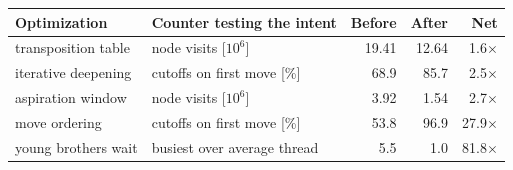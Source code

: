 \begin{table}[htbp]
\centering
\footnotesize
\setlength{\tabcolsep}{5pt}
\begin{tabular}{@{}llrrr@{}}
\toprule
Optimization & Counter testing the intent & Before & After & Net \\
\midrule
transposition table & node visits [$10^6$] & 19.41 & 12.64 & 1.6$\times$ \\
iterative deepening & cutoffs on first move [\%] & 68.9 & 85.7 & 2.5$\times$ \\
aspiration window & node visits [$10^6$] & 3.92 & 1.54 & 2.7$\times$ \\
move ordering & cutoffs on first move [\%] & 53.8 & 96.9 & 27.9$\times$ \\
young brothers wait & busiest over average thread & 5.5 & 1.0 & 81.8$\times$ \\
\bottomrule
\end{tabular}
\end{table}
